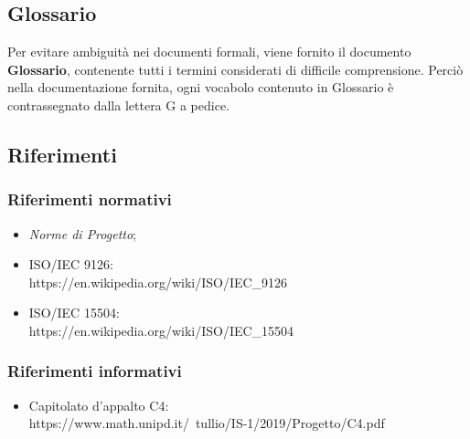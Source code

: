 \subsection{Glossario}
Per evitare ambiguità nei documenti formali, viene fornito il documento \textbf{Glossario},
contenente tutti i termini considerati di difficile comprensione. Perciò nella documentazione fornita, ogni vocabolo contenuto in Glossario è contrassegnato dalla lettera G a pedice.

\subsection{Riferimenti}
\subsubsection{Riferimenti normativi}
\begin{itemize}
	\item \textit{Norme di Progetto};
	\item ISO/IEC 9126: \\
	https://en.wikipedia.org/wiki/ISO/IEC_9126
	\item ISO/IEC 15504: \\
	https://en.wikipedia.org/wiki/ISO/IEC_15504
\end{itemize}
\subsubsection{Riferimenti informativi}
\begin{itemize}
	\item Capitolato d'appalto C4: \\
	 https://www.math.unipd.it/~tullio/IS-1/2019/Progetto/C4.pdf
\end{itemize}